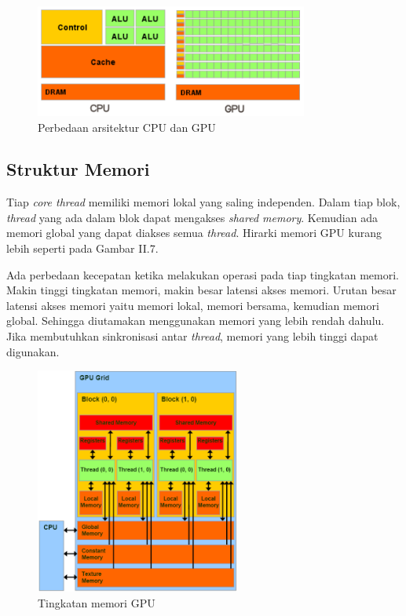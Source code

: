     
  \begin{figure}[htb]
    \centering
    \includegraphics[width=0.8\textwidth]{resources/GPUvsCPU.png}
    \caption[Perbedaan arsitektur CPU dan GPU]{Perbedaan arsitektur CPU dan GPU \citep{cuda}}
  \end{figure}
    

  \subsection{Struktur Memori}
    
    Tiap \emph{core thread} memiliki memori lokal yang saling independen. Dalam tiap blok, \emph{thread} yang ada dalam blok dapat mengakses \emph{shared memory}. Kemudian ada memori global yang dapat diakses semua \emph{thread}. Hirarki memori GPU kurang lebih seperti pada Gambar II.7.
    
    Ada perbedaan kecepatan ketika melakukan operasi pada tiap tingkatan memori. Makin tinggi tingkatan memori, makin besar latensi akses memori. Urutan besar latensi akses memori yaitu memori lokal, memori bersama, kemudian memori global. Sehingga diutamakan menggunakan memori yang lebih rendah dahulu. Jika membutuhkan sinkronisasi antar \emph{thread}, memori yang lebih tinggi dapat digunakan. 
    
    \begin{figure}[htb]
      \centering
      \includegraphics[width=0.6\textwidth]{resources/cudamem.png}
      \caption[Tingkatan memori GPU]{Tingkatan memori GPU \citep{cuda}}
    \end{figure}

